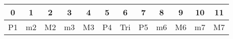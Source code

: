 \documentclass{standalone}
\begin{document}
     \begin{tabular}{||c|c|c|c|c|c|c|c|c|c|c|c||} 
     \hline
      0 & 1 & 2 & 3 & 4 & 5 & 6 & 7 & 8 & 9 & 10 & 11  \\
     \hline \hline 
      P1 & m2 & M2 & m3 & M3 & P4 & Tri & P5 & m6 & M6 & m7 & M7
  \end{tabular}
\end{document}
